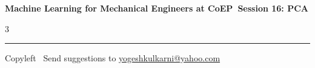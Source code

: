 \documentclass[8pt,landscape]{article}
\begin{document}
\footnotesize

\begin{center}
\Large{\textbf{Machine Learning for Mechanical Engineers at CoEP\ Session 16: PCA}}
\end{center}

\begin{multicols}{3}

\end{multicols}

\rule{\linewidth}{0.25pt}
\scriptsize
Copyleft \textcopyleft\  Send suggestions to
\href{http://www.yogeshkulkarni.com}{yogeshkulkarni@yahoo.com}
\end{document}
